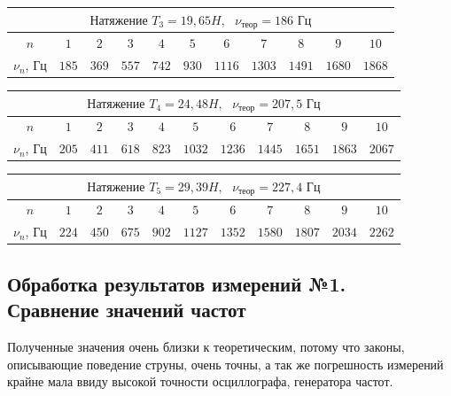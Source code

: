 \documentclass[a4paper, 12pt]{article} %
\begin{document}
\begin{center}
\begin{tabular}{|c|c|c|c|c|c|c|c|c|c|c|}
\hline 
\multicolumn{11}{|c|}{$\textbf{Натяжение } T_3 = 19,65H, \text{ } \nu_{\text{теор}} = 186 \text{ Гц}$} \\ 
\hline 
$n$ & $1$ & $2$ & $3$ & $4$ & $5$ & $6$ & $7$ & $8$ & $9$ & $10$ \\ 
\hline 
$\nu_n$, Гц & $185$ & $369$ & $557$ & $742$ & $930$ & $1116$ & $1303$ & $1491$ & $1680$& $1868$\\
\hline
\end{tabular} 
\end{center}

\begin{center}
\begin{tabular}{|c|c|c|c|c|c|c|c|c|c|c|}
\hline 
\multicolumn{11}{|c|}{$\textbf{Натяжение } T_4 = 24,48H, \text{ } \nu_{\text{теор}} = 207,5 \text{ Гц}$} \\ 
\hline 
$n$ & $1$ & $2$ & $3$ & $4$ & $5$ & $6$ & $7$ & $8$ & $9$ & $10$ \\ 
\hline 
$\nu_n$, Гц & $205$ & $411$ & $618$ & $823$ & $1032$ & $1236$ & $1445$ & $1651$ & $1863$& $2067$\\
\hline
\end{tabular} 
\end{center}

\begin{center}
\begin{tabular}{|c|c|c|c|c|c|c|c|c|c|c|}
\hline 
\multicolumn{11}{|c|}{$\textbf{Натяжение } T_5 = 29,39H, \text{ } \nu_{\text{теор}} = 227,4 \text{ Гц}$} \\ 
\hline 
$n$ & $1$ & $2$ & $3$ & $4$ & $5$ & $6$ & $7$ & $8$ & $9$ & $10$ \\ 
\hline 
$\nu_n$, Гц & $224$ & $450$ & $675$ & $902$ & $1127$ & $1352$ & $1580$ & $1807$ & $2034$& $2262$\\
\hline
\end{tabular} 
\end{center}

\subsection{Обработка результатов измерений №1.\\ Сравнение значений частот}

Полученные значения очень близки к теоретическим, потому что законы, описывающие поведение струны, очень точны, а так же погрешность измерений крайне мала ввиду высокой точности осциллографа, генератора частот.
\end{document}
